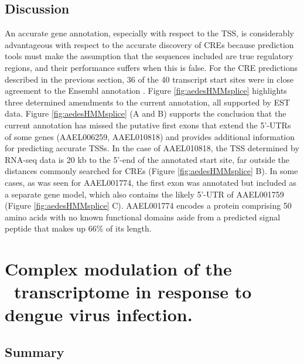 \subsection{Discussion}
An accurate gene annotation, especially with respect to the \gls{TSS}, is considerably advantageous with respect to the accurate discovery of \glspl{CRE} because prediction tools must make the assumption that the sequences included are true regulatory regions, and their performance suffers when this is false. For the \gls{CRE} predictions described in the previous section, 36 of the 40 transcript start sites were in close agreement to the Ensembl annotation \cite{Hubbard2002}. Figure \ref{fig:aedesHMMsplice} highlights three determined amendments to the current annotation, all supported by EST data. Figure \ref{fig:aedesHMMsplice} (A and B) supports the conclusion that the current annotation has missed the putative first exons that extend the 5'-UTRs of some genes (AAEL006259, AAEL010818) and provides additional information for predicting accurate \glspl{TSS}. In the case of AAEL010818, the \gls{TSS} determined by RNA-seq data is 20 kb to the 5'-end of the annotated start site, far outside the distances commonly searched for \glspl{CRE} (Figure \ref{fig:aedesHMMsplice} B). In some cases, as was seen for AAEL001774, the first exon was annotated but included as a separate gene model, which also contains the likely 5'-UTR of AAEL001759 (Figure \ref{fig:aedesHMMsplice} C). AAEL001774 encodes a protein comprising 50 amino acids with no known functional domains aside from a predicted signal peptide that makes up 66\% of its length.










\pagebreak
\section{Complex modulation of the \Aea\ transcriptome in response to dengue virus infection. \cite{bonizzoni2012complex}}
\subsection{Summary}

